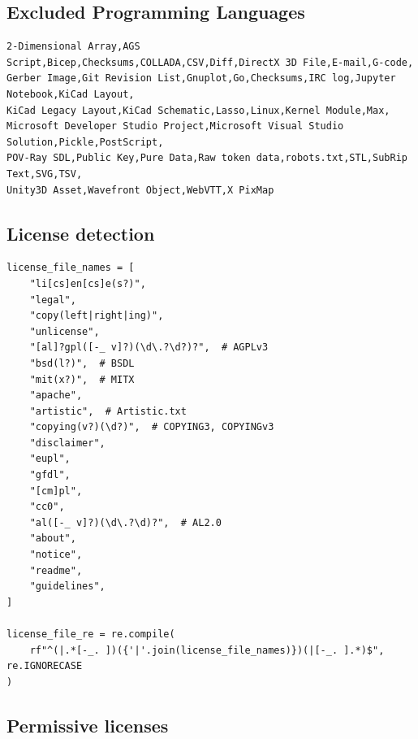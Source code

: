 \documentclass[10pt]{article} %
\begin{document}
\subsection{Excluded Programming Languages}\label{sec:excluded_pls}
\begin{Verbatim}
2-Dimensional Array,AGS Script,Bicep,Checksums,COLLADA,CSV,Diff,DirectX 3D File,E-mail,G-code,
Gerber Image,Git Revision List,Gnuplot,Go,Checksums,IRC log,Jupyter Notebook,KiCad Layout,
KiCad Legacy Layout,KiCad Schematic,Lasso,Linux,Kernel Module,Max,
Microsoft Developer Studio Project,Microsoft Visual Studio Solution,Pickle,PostScript,
POV-Ray SDL,Public Key,Pure Data,Raw token data,robots.txt,STL,SubRip Text,SVG,TSV,
Unity3D Asset,Wavefront Object,WebVTT,X PixMap
\end{Verbatim}

\subsection{License detection}
\label{appendix:license_regex}
\begin{verbatim}
license_file_names = [
    "li[cs]en[cs]e(s?)",
    "legal",
    "copy(left|right|ing)",
    "unlicense",
    "[al]?gpl([-_ v]?)(\d\.?\d?)?",  # AGPLv3
    "bsd(l?)",  # BSDL
    "mit(x?)",  # MITX
    "apache",
    "artistic",  # Artistic.txt
    "copying(v?)(\d?)",  # COPYING3, COPYINGv3
    "disclaimer",
    "eupl",
    "gfdl",
    "[cm]pl",
    "cc0",
    "al([-_ v]?)(\d\.?\d)?",  # AL2.0
    "about",
    "notice",
    "readme",
    "guidelines",
]

license_file_re = re.compile(
    rf"^(|.*[-_. ])({'|'.join(license_file_names)})(|[-_. ].*)$", re.IGNORECASE
)
\end{verbatim}

\subsection{Permissive licenses}
\label{appendix:permissive_licenses}
\end{document}
